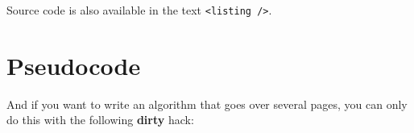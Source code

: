 \begin{filecontents*}{\democodefile}
Source code is also available in the text \lstinline|<listing />|.
\end{filecontents*}


\section{Pseudocode}

\clearpage
And if you want to write an algorithm that goes over several pages, you can only do this with the following \textbf{dirty} hack:

